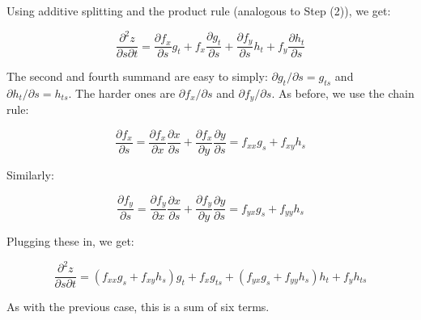 \documentclass[10pt]{amsart}
\begin{document}
Using additive splitting and the product rule (analogous to Step (2)), we get:

$$\frac{\partial^2z}{\partial s \partial t} = \frac{\partial f_x}{\partial s}g_t + f_x\frac{\partial g_t}{\partial s} + \frac{\partial f_y}{\partial s}h_t + f_y \frac{\partial h_t}{\partial s}$$

The second and fourth summand are easy to simply: $\partial
g_t/\partial s = g_{ts}$ and $\partial h_t/\partial s = h_{ts}$. The
harder ones are $\partial f_x/\partial s$ and $\partial f_y/\partial
s$. As before, we use the chain rule:

$$\frac{\partial f_x}{\partial s} = \frac{\partial f_x}{\partial x}\frac{\partial x}{\partial s} + \frac{\partial f_x}{\partial y}\frac{\partial y}{\partial s} = f_{xx}g_s + f_{xy}h_s$$

Similarly:

$$\frac{\partial f_y}{\partial s} = \frac{\partial f_y}{\partial x}\frac{\partial x}{\partial s} + \frac{\partial f_y}{\partial y}\frac{\partial y}{\partial s} = f_{yx}g_s + f_{yy}h_s$$

Plugging these in, we get:

$$\frac{\partial^2z}{\partial s\partial t} = (f_{xx}g_s + f_{xy}h_s)g_t + f_xg_{ts} + (f_{yx}g_s + f_{yy}h_s)h_t + f_yh_{ts}$$

As with the previous case, this is a sum of six terms.
\end{document}
